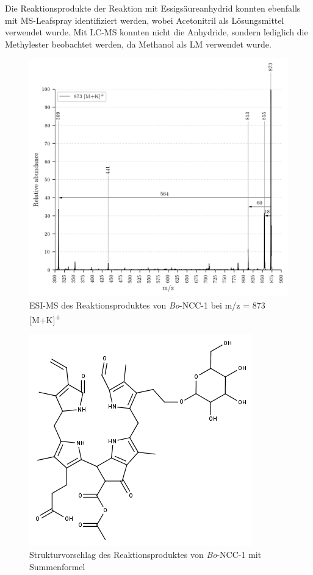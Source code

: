 \documentclass[12pt,a4paper]{article}
\begin{document}
Die Reaktionsprodukte der Reaktion mit Essigsäureanhydrid konnten ebenfalls mit MS-Leafspray identifiziert werden, wobei Acetonitril als Lösungsmittel verwendet wurde. Mit LC-MS konnten nicht die Anhydride, sondern lediglich die Methylester beobachtet werden, da Methanol als LM verwendet wurde.

\begin{figure}[htbp]
  \includegraphics[width=\textwidth, height=0.7\textwidth]{figures/Kapitel4/Kataboliten/VWA_MS_LeafSpray_873.png} 
  \caption[ESI-MS des Reaktionsproduktes von \textit{Bo}-NCC-1, Quelle: Autor]{ESI-MS des Reaktionsproduktes von \textit{Bo}-NCC-1 bei m/z = 873 [M+K]\textsuperscript{+}}
  \label{fig:873MKLeafspray}
\end{figure}

\begin{figure}[htbp]
  \centering
  \includegraphics[scale=0.6]{figures/Kapitel4/Kataboliten/fragmentation_structures/VWA_Katabolit_873.png}
  \caption[Strukturvorschlag des Reaktionsproduktes von \textit{Bo}-NCC-1, Quelle: Autor]{Strukturvorschlag des Reaktionsproduktes von \textit{Bo}-NCC-1 mit Summenformel }
  \label{fig:873MKstructure}
\end{figure}
\end{document}
